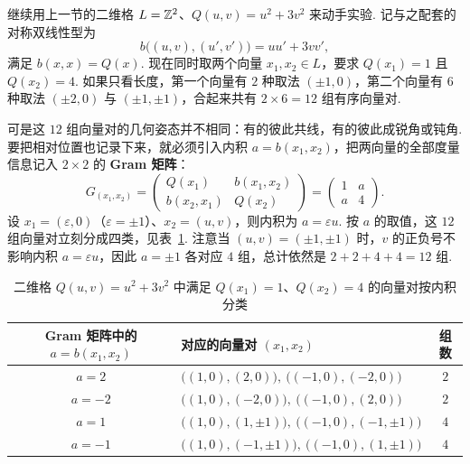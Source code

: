 继续用上一节的二维格 $L=\mathbb{Z}^2$、$Q(u,v)=u^2+3v^2$ 来动手实验. 记与之配套的对称双线性型为
\[
b\bigl((u,v),(u',v')\bigr)=uu'+3vv',
\]
满足 $b(x,x)=Q(x)$. 现在同时取两个向量 $x_1,x_2\in L$，要求 $Q(x_1)=1$ 且 $Q(x_2)=4$. 如果只看长度，第一个向量有 $2$ 种取法 $(\pm 1,0)$，第二个向量有 $6$ 种取法 $(\pm 2,0)$ 与 $(\pm 1,\pm 1)$，合起来共有 $2\times 6=12$ 组有序向量对.

可是这 $12$ 组向量对的几何姿态并不相同：有的彼此共线，有的彼此成锐角或钝角. 要把相对位置也记录下来，就必须引入内积 $a=b(x_1,x_2)$，把两向量的全部度量信息记入 $2\times 2$ 的 \textbf{Gram 矩阵}：
\[
G_{(x_1,x_2)}=\begin{pmatrix} Q(x_1) & b(x_1,x_2) \\ b(x_2,x_1) & Q(x_2) \end{pmatrix}=\begin{pmatrix} 1 & a \\ a & 4 \end{pmatrix}.
\]
设 $x_1=(\varepsilon,0)$（$\varepsilon=\pm 1$）、$x_2=(u,v)$，则内积为 $a=\varepsilon u$. 按 $a$ 的取值，这 $12$ 组向量对立刻分成四类，见表~\ref{tab:appC-gram-pairs}. 注意当 $(u,v)=(\pm 1,\pm 1)$ 时，$v$ 的正负号不影响内积 $a=\varepsilon u$，因此 $a=\pm 1$ 各对应 $4$ 组，总计依然是 $2+2+4+4=12$ 组.

\begin{table}[htbp]
\centering
\caption{二维格 $Q(u,v)=u^2+3v^2$ 中满足 $Q(x_1)=1$、$Q(x_2)=4$ 的向量对按内积分类}
\label{tab:appC-gram-pairs}
\small
\begin{tabular}{@{}clc@{}}
\toprule
Gram 矩阵中的 $a=b(x_1,x_2)$ & 对应的向量对 $(x_1,x_2)$ & 组数 \\
\midrule
$a=2$ & $\bigl((1,0),(2,0)\bigr),\ \bigl((-1,0),(-2,0)\bigr)$ & $2$ \\
$a=-2$ & $\bigl((1,0),(-2,0)\bigr),\ \bigl((-1,0),(2,0)\bigr)$ & $2$ \\
$a=1$ & $\bigl((1,0),(1,\pm 1)\bigr),\ \bigl((-1,0),(-1,\pm 1)\bigr)$ & $4$ \\
$a=-1$ & $\bigl((1,0),(-1,\pm 1)\bigr),\ \bigl((-1,0),(1,\pm 1)\bigr)$ & $4$ \\
\bottomrule
\end{tabular}
\end{table}

